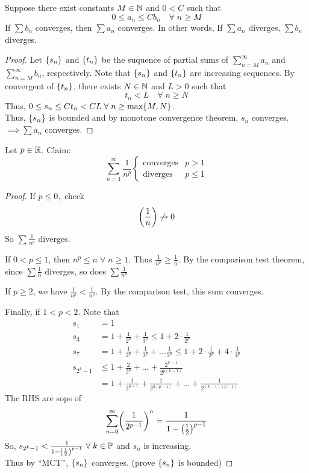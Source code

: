 \documentclass[12pt]{article}
\begin{document}
\begin{thm} \label{thm:comparison}
    Suppose there exist constants $M \in \mathbb{N}$ and $0 < C$ such that \[
        0 \leq a_{n} \leq C b_{n} \quad\forall\; n \geq M
    \] If $\sum b_{n}$ converges, then $\sum a_{n}$ converges. In other words, If $\sum a_{n}$ diverges, $\sum b_{n}$ diverges.
\end{thm}
\begin{proof}
Let $\set{s_{n}}$ and $\set{t_{n}}$ be the suquence of partial sums of $\sum_{n=M}^{\infty} a_{n}$ and $\sum_{n=M}^{\infty} b_{n}$, respectively. Note that $\set{s_{n}}$ and $\set{t_{n}}$ are increasing sequences. By convergent of $\set{t_{n}}$, there exists $N \in\mathbb{N}$ and $L > 0$ such that \[
        t_{n} < L \quad \forall\; n \geq N
    \] Thus, $0 \leq s_{n} \leq Ct_{n} < CL \;\forall\; n \geq \max\set{M, N}$. \\
    Thus, $\set{s_{n}}$ is bounded and by monotone convergence theorem, $s_{n}$ converges. \\
    $\implies \sum a_{n}$ converges.
\end{proof}
\begin{example}
    Let $p \in \mathbb{R}$. Claim: \[
        \sum_{n=1}^{\infty} \frac{1}{n^{p}}
        \begin{cases}
            \text{converges} & p > 1 \\
            \text{diverges} & p \leq 1
        \end{cases}
    \]
\end{example}
\begin{proof}
    If $p \leq 0,$ check \[
        \paren{\frac{1}{n}} \not\to 0
    \] So $\sum \frac{1}{n^{p}}$ diverges.

    If $0 < p \leq 1$, then $n^{p} \leq n \;\forall\; n \geq 1$. Thus $\frac{1}{n^{p}} \geq \frac{1}{n}$. By the comparison test theorem, since $\sum \frac{1}{n}$ diverges, so does $\sum \frac{1}{n^{p}}$

    If $p \geq 2$, we have $\frac{1}{n^{p}} < \frac{1}{n^{2}}$. By the comparison test, this sum converges.

    Finally, if $1 < p < 2$. Note that
    \begin{align*}
        s_{1} &= 1 \\
        s_{3} &= 1 + \frac{1}{2^{p}} + \frac{1}{3^{p}} \leq 1 + 2 \cdot \frac{1}{2^{p}} \\
        s_{7} &= 1 + \frac{1}{2^{p}} + \frac{1}{3^{p}} + \dots \frac{1}{7^{p}} \leq 1 + 2\cdot \frac{1}{2^{p}} + 4 \cdot \frac{1}{4^{p}} \\
        s_{2^{k} - 1} &\leq 1 + \frac{2}{2^{p}} + \dots + \frac{2^{k-1}}{2^{p(k-1)}} \\
        &= 1 + \frac{1}{2^{p-1}} + \frac{1}{2^{2(p-1)}} + \dots + \frac{1}{2^{(k-1)(p-1)}}
    \end{align*}
    The RHS are sops of \[
        \sum_{n=0}^{\infty} \paren{\frac{1}{2^{p-1}}}^{n} = \frac{1}{1-\paren{\frac{1}{2}}^{p-1}}
    \] So, $s_{2^{k}-1} < \frac{1}{1-\paren{\frac{1}{2}}^{p-1}} \;\forall\; k \in \P$ and $s_{n}$ is increasing. \\
    Thus by ``MCT'', $\set{s_{n}}$ converges. (\textcolor{red!85!black}{prove $\set{s_{n}}$ is bounded})
\end{proof}
\end{document}
